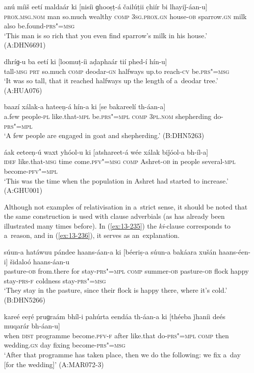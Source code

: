 \begin{exe}
\ex
\label{ex:13-231}
\gll anú míiš eetí maldaár ki [nisíi  ɡhooṣṭ-á čailúṭii c̣hiír bi lhayiǰ-áan-u] \\
\textsc{prox.msg.nom} man so.much wealthy \textsc{comp} \textsc{3sg.prox.gn }  house-\textsc{ob} sparrow.\textsc{gn} milk also be.found-\textsc{prs"=msg} \\
\glt `This man is so rich that you even find sparrow's milk in his house.' (A:DHN6691)

\ex
\label{ex:13-232}
\gll dhríɡ-u ba eetí ki [loomuṭ-íi aḍaphaár  tií phed-í hín-u] \\
tall-\textsc{msg} \textsc{prt} so.much \textsc{comp} deodar-\textsc{gn} halfways up.to reach-\textsc{cv} be.\textsc{prs"=msg} \\
\glt `It was so tall, that it reached halfways up the length of a~deodar tree.' (A:HUA076)

\ex
\label{ex:13-233}
\gll baazí xálak-a hateeṇ-á hín-a ki  [se bakareelí th-áan-a]  \\
a.few people-\textsc{pl}  like.that-\textsc{mpl} be.\textsc{prs"=mpl} \textsc{comp}  \textsc{3pl.nom}  shepherding do-\textsc{prs"=mpl} \\
\glt `A few people are engaged in goat and shepherding.' (B:DHN5263)

\ex
\label{ex:13-234}
\gll áak eeteeṇ-ú waxt yhóol-u ki  [atshareet-á wée xálak biǰóol-a bh-íl-a] \\
\textsc{idef} like.that-\textsc{msg} time come.\textsc{pfv"=msg} \textsc{comp} Ashret-\textsc{ob} in people several-\textsc{mpl} become-\textsc{pfv"=mpl} \\
\glt `This was the time when the population in Ashret had started to increase.' (A:GHU001) 
\end{exe}

Although not examples of relativisation in a~strict sense, it should be noted that the same construction is used with clause adverbials (as has already been illustrated many times before). In (\ref{ex:13-235}) the \textit{ki}-clause corresponds to a~reason, and in (\ref{ex:13-236}), it serves as an~explanation.

\begin{exe}
\ex
\label{ex:13-235}
\gll súun-a hatáwuu pándee haans-áan-a ki  [béeriṣ-a súun-a bakáara
  xušán haans-éen-i]  šidaloó haans-áan-u \\
pasture-\textsc{ob} from.there for stay-\textsc{prs"=mpl} \textsc{comp}  summer-\textsc{ob} pasture-\textsc{ob} flock happy stay-\textsc{prs-f} coldness stay-\textsc{prs"=msg} \\
\glt `They stay in the pasture, since their flock is happy there, where it's cold.' (B:DHN5266)

\ex
\label{ex:13-236}
\gll kareé eeṛé pruɡraám bhíl-i pahúrta eendáa  th-áan-a ki [théeba
  ǰhaníi deés muqarár  bh-áan-u] \\
when \textsc{dist} programme become.\textsc{pfv-f} after like.that  do-\textsc{prs"=mpl} \textsc{comp} then wedding.\textsc{gn} day fixing become-\textsc{prs"=msg} \\
\glt `After that programme has taken place, then we do the following: we fix a~day [for the wedding]' (A:MAR072-3)
\end{exe}